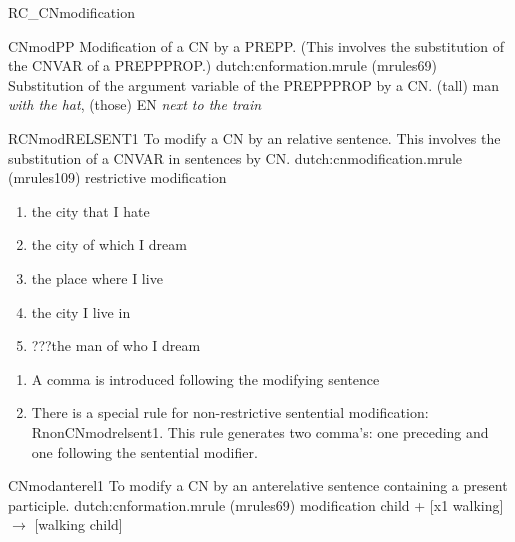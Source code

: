 \begin{mruleclass}{RC\_CNmodification}
\begin{members}
\begin{member}
\end{member}
\begin{member}
 CNmodPP
 Modification of a CN by a PREPP. (This involves the
substitution  of the CNVAR of a PREPPPROP.)
\file dutch:cnformation.mrule (mrules69)
\semantics Substitution of the argument variable of the PREPPPROP by a CN.
\example (tall) man {\em with the hat}, (those) EN {\em next to the train}
\remarks\mbox{}

\end{member}

\begin{member}

 RCNmodRELSENT1
 To modify a CN by an relative sentence. This involves the 
substitution of a CNVAR in sentences by CN.
\file dutch:cnmodification.mrule (mrules109)
\semantics restrictive modification
\example \mbox{}
\begin{enumerate}
\item  the city that I hate
\item  the city of which I dream 
\item  the place where I live
\item  the city I live in 
\item  ???the man of who I dream 
\end{enumerate}
\remarks\mbox{}
\begin{enumerate}
  \item 
A comma is introduced following the modifying sentence
  \item 
There is a special rule for non-restrictive sentential modification:
RnonCNmodrelsent1. This rule generates two comma's: one preceding and one 
following the sentential modifier.
\end{enumerate}
\end{member}
\begin{member}
 CNmodanterel1
 To modify a CN by an anterelative sentence containing
a present participle.
\file dutch:cnformation.mrule (mrules69)
\semantics modification
\example
child + [x1 walking] $\rightarrow$ [walking child]
\remarks\mbox{}
\end{member}
\end{members}
\end{mruleclass}

